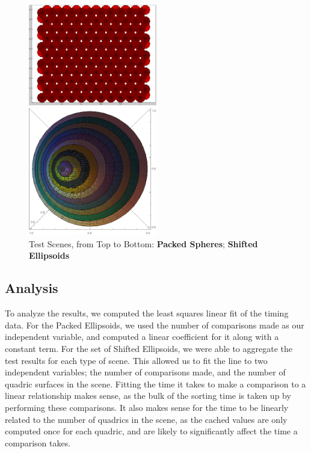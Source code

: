 \documentclass{cccg16}
\begin{document}
\begin{figure}
  \includegraphics[width=0.5\textwidth]{imgs/packedSpheres.png}
  
  \vspace{5mm}
  \includegraphics[width=0.5\textwidth]{imgs/hardEllipsoidsSingle.png}
  \caption{Test Scenes, from Top to Bottom:
    {\bf Packed Spheres};
    {\bf Shifted Ellipsoids}}
  \label{fig:testScenes}
\end{figure}

\subsection{Analysis}
To analyze the results, we computed the least squares linear fit of
the timing data.  For the Packed Ellipsoids, we used the number of
comparisons made as our independent variable, and computed a linear
coefficient for it along with a constant term.  For the set of Shifted
Ellipsoids, we were able to aggregate the test results for each type
of scene.  This allowed us to fit the line to two independent
variables; the number of comparisons made, and the number of quadric
surfaces in the scene.  Fitting the time it takes to make a comparison
to a linear relationship makes sense, as the bulk of the sorting time
is taken up by performing these comparisons.  It also makes sense for
the time to be linearly related to the number of quadrics in the
scene, as the cached values are only computed once for each quadric,
and are likely to significantly affect the time a comparison takes.
\end{document}
